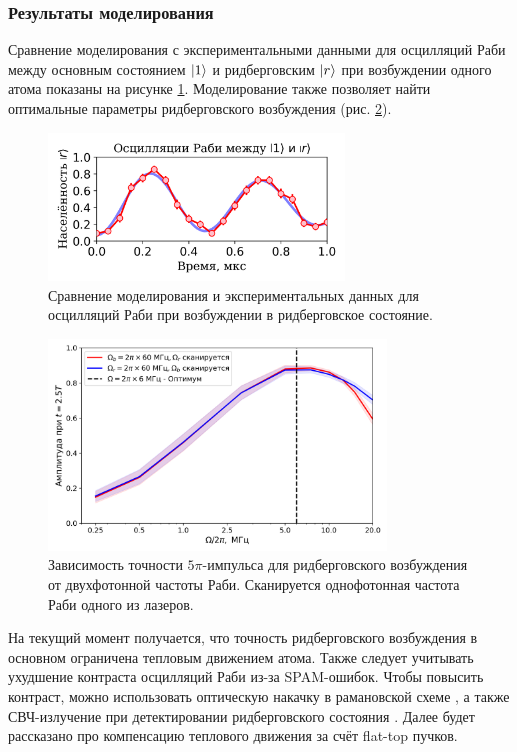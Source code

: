 \subsubsection{Результаты моделирования}
\label{sec:results_chapter_4}

Сравнение моделирования с экспериментальными данными для осцилляций Раби между основным состоянием $\left| 1 \right\rangle$ и ридберговским $\left| r \right\rangle$ при возбуждении одного атома показаны на рисунке \ref{fig:rydberg_rabi_comparison}. Моделирование также позволяет найти оптимальные параметры ридберговского возбуждения (рис. \ref{fig:rydberg_rabi_optimal}). 

\begin{figure}[H]
	\centering
	\includegraphics[width=0.7\textwidth]{images/rydberg_model.png}
	\caption{Сравнение моделирования и экспериментальных данных для осцилляций Раби при возбуждении в ридберговское состояние.}
	\label{fig:rydberg_rabi_comparison}
\end{figure}

\begin{figure}[H]
	\centering
	\includegraphics[width=0.8\textwidth]{images/rydberg_optimal.png}
	\caption{Зависимость точности $5\pi$-импульса для ридберговского возбуждения от двухфотонной частоты Раби. Сканируется однофотонная частота Раби одного из лазеров.}
	\label{fig:rydberg_rabi_optimal}
\end{figure}
На текущий момент получается, что точность ридберговского возбуждения в основном ограничена тепловым движением атома. Также следует учитывать ухудшение контраста осцилляций Раби из-за SPAM-ошибок. Чтобы повысить контраст, можно использовать оптическую накачку в рамановской схеме \cite{toffoli}, а также СВЧ-излучение при детектировании ридберговского состояния \cite{Ebadi_2021}. Далее будет рассказано про компенсацию теплового движения за счёт flat-top пучков.


